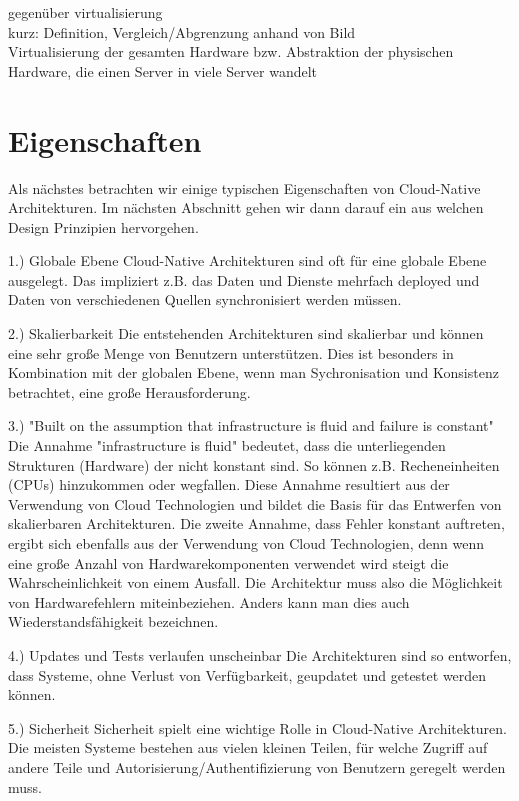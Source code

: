 gegenüber virtualisierung\\
kurz: Definition, Vergleich/Abgrenzung anhand von Bild\\

Virtualisierung der gesamten Hardware bzw. Abstraktion der physischen Hardware, die einen Server in viele Server wandelt\\

\section{Eigenschaften}
Als nächstes betrachten wir einige typischen Eigenschaften von Cloud-Native Architekturen. Im nächsten Abschnitt gehen wir dann darauf ein aus welchen Design Prinzipien hervorgehen.

1.) Globale Ebene
Cloud-Native Architekturen sind oft für eine globale Ebene ausgelegt. Das impliziert z.B. das Daten und Dienste mehrfach deployed und Daten von verschiedenen Quellen synchronisiert werden müssen.

2.) Skalierbarkeit
Die entstehenden Architekturen sind skalierbar und können eine sehr große Menge von Benutzern unterstützen. Dies ist besonders in Kombination mit der globalen Ebene, wenn man Sychronisation und Konsistenz betrachtet, eine große Herausforderung.

3.) "Built on the assumption that infrastructure is fluid and failure is constant"
Die Annahme "infrastructure is fluid" bedeutet, dass die unterliegenden Strukturen (Hardware) der nicht konstant sind. So können z.B. Recheneinheiten (CPUs) hinzukommen oder wegfallen. Diese Annahme resultiert aus der Verwendung von Cloud Technologien und bildet die Basis für das Entwerfen von skalierbaren Architekturen.
Die zweite Annahme, dass Fehler konstant auftreten, ergibt sich ebenfalls aus der Verwendung von Cloud Technologien, denn wenn eine große Anzahl von Hardwarekomponenten verwendet wird steigt die Wahrscheinlichkeit von einem Ausfall. Die Architektur muss also die Möglichkeit von Hardwarefehlern miteinbeziehen. Anders kann man dies auch Wiederstandsfähigkeit bezeichnen.

4.) Updates und Tests verlaufen unscheinbar
Die Architekturen sind so entworfen, dass Systeme, ohne Verlust von Verfügbarkeit, geupdatet und getestet werden können.

5.) Sicherheit
Sicherheit spielt eine wichtige Rolle in Cloud-Native Architekturen. Die meisten Systeme bestehen  aus vielen kleinen Teilen, für welche Zugriff auf andere Teile und Autorisierung/Authentifizierung von Benutzern geregelt werden muss.

